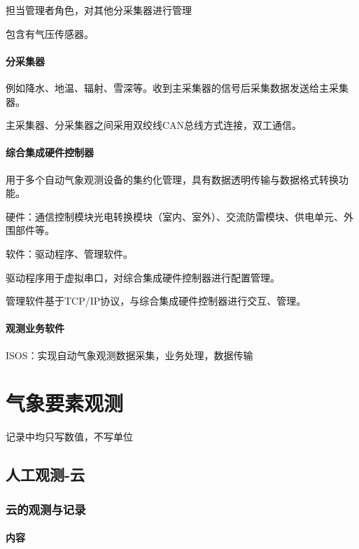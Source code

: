 ﻿\documentclass[UTF8,11pt]{ctexbook}%
\begin{document}
担当管理者角色，对其他分采集器进行管理

包含有气压传感器。

\subsubsection{分采集器}

例如降水、地温、辐射、雪深等。收到主采集器的信号后采集数据发送给主采集器。

主采集器、分采集器之间采用双绞线CAN总线方式连接，双工通信。

\subsubsection{综合集成硬件控制器}

用于多个自动气象观测设备的集约化管理，具有数据透明传输与数据格式转换功能。

硬件：通信控制模块光电转换模块（室内、室外）、交流防雷模块、供电单元、外围部件等。

软件：驱动程序、管理软件。

驱动程序用于虚拟串口，对综合集成硬件控制器进行配置管理。

管理软件基于TCP/IP协议，与综合集成硬件控制器进行交互、管理。

\subsubsection{观测业务软件}

ISOS：实现自动气象观测数据采集，业务处理，数据传输

\chapter{气象要素观测}

记录中均只写数值，不写单位

\section{人工观测-云}

\subsection{云的观测与记录}

\subsubsection{内容}
\end{document}
